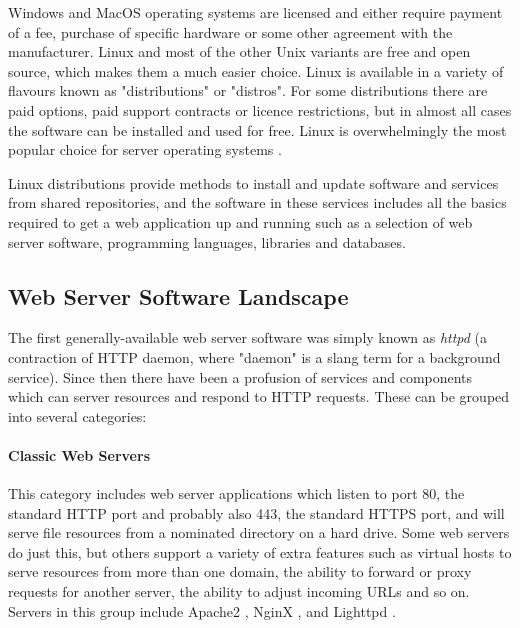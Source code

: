 Windows and MacOS operating systems are licensed and either require payment of a fee, purchase of specific hardware or some other agreement with the manufacturer. Linux and most of the other Unix variants are free and open source, which makes them a much easier choice. Linux is available in a variety of flavours known as "distributions" or "distros". For some distributions there are paid options, paid support contracts or licence restrictions, but in almost all cases the software can be installed and used for free. Linux is overwhelmingly the most popular choice for server operating systems .

Linux distributions provide methods to install and update software and services from shared repositories, and the software in these services includes all the basics required to get a web application up and running such as a selection of web server software, programming languages, libraries and databases.

\subsection{Web Server Software Landscape}
The first generally-available web server software was simply known as \emph{httpd} (a contraction of HTTP daemon, where "daemon" is a slang term for a background service). Since then there have been a profusion of services and components which can server resources and respond to HTTP requests. These can be grouped into several categories:

\paragraph{Classic Web Servers}
This category includes web server applications which listen to port 80, the standard HTTP port and probably also 443, the standard HTTPS port, and will serve file resources from a nominated directory on a hard drive. Some web servers do just this, but others support a variety of extra features such as virtual hosts to serve resources from more than one domain, the ability to forward or proxy requests for another server, the ability to adjust incoming URLs and so on. Servers in this group include Apache2 , NginX , and Lighttpd .

